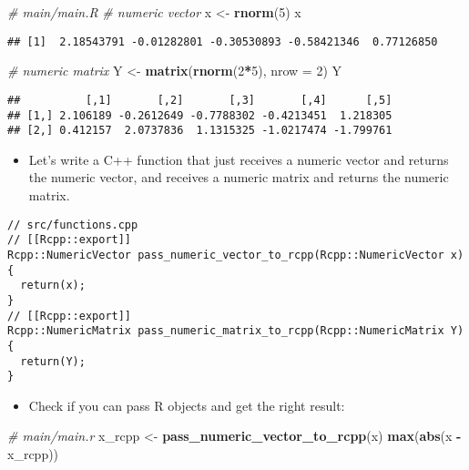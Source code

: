 \documentclass[
]{book}
\newenvironment{Shaded}{\begin{snugshade}}{\end{snugshade}}
\newcommand{\AttributeTok}[1]{\textcolor[rgb]{0.13,0.29,0.53}{#1}}
\newcommand{\CommentTok}[1]{\textcolor[rgb]{0.56,0.35,0.01}{\textit{#1}}}
\newcommand{\DecValTok}[1]{\textcolor[rgb]{0.00,0.00,0.81}{#1}}
\newcommand{\FunctionTok}[1]{\textcolor[rgb]{0.13,0.29,0.53}{\textbf{#1}}}
\newcommand{\NormalTok}[1]{#1}
\newcommand{\OtherTok}[1]{\textcolor[rgb]{0.56,0.35,0.01}{#1}}
\newcommand{\SpecialCharTok}[1]{\textcolor[rgb]{0.81,0.36,0.00}{\textbf{#1}}}
\providecommand{\tightlist}{%
  \setlength{\itemsep}{0pt}\setlength{\parskip}{0pt}}
\begin{document}
\begin{Shaded}
\begin{Highlighting}[]
\CommentTok{\# main/main.R}
\CommentTok{\# numeric vector }
\NormalTok{x }\OtherTok{\textless{}{-}} \FunctionTok{rnorm}\NormalTok{(}\DecValTok{5}\NormalTok{)}
\NormalTok{x}
\end{Highlighting}
\end{Shaded}

\begin{verbatim}
## [1]  2.18543791 -0.01282801 -0.30530893 -0.58421346  0.77126850
\end{verbatim}

\begin{Shaded}
\begin{Highlighting}[]
\CommentTok{\# numeric matrix}
\NormalTok{Y }\OtherTok{\textless{}{-}} \FunctionTok{matrix}\NormalTok{(}\FunctionTok{rnorm}\NormalTok{(}\DecValTok{2}\SpecialCharTok{*}\DecValTok{5}\NormalTok{), }\AttributeTok{nrow =} \DecValTok{2}\NormalTok{)}
\NormalTok{Y}
\end{Highlighting}
\end{Shaded}

\begin{verbatim}
##          [,1]       [,2]       [,3]       [,4]      [,5]
## [1,] 2.106189 -0.2612649 -0.7788302 -0.4213451  1.218305
## [2,] 0.412157  2.0737836  1.1315325 -1.0217474 -1.799761
\end{verbatim}

\begin{itemize}
\tightlist
\item
  Let's write a C++ function that just receives a numeric vector and returns the numeric vector, and receives a numeric matrix and returns the numeric matrix.
\end{itemize}

\begin{verbatim}
// src/functions.cpp
// [[Rcpp::export]]
Rcpp::NumericVector pass_numeric_vector_to_rcpp(Rcpp::NumericVector x) {
  return(x);
}
// [[Rcpp::export]]
Rcpp::NumericMatrix pass_numeric_matrix_to_rcpp(Rcpp::NumericMatrix Y) {
  return(Y);
}
\end{verbatim}

\begin{itemize}
\tightlist
\item
  Check if you can pass R objects and get the right result:
\end{itemize}

\begin{Shaded}
\begin{Highlighting}[]
\CommentTok{\# main/main.r}
\NormalTok{x\_rcpp }\OtherTok{\textless{}{-}} \FunctionTok{pass\_numeric\_vector\_to\_rcpp}\NormalTok{(x)}
\FunctionTok{max}\NormalTok{(}\FunctionTok{abs}\NormalTok{(x }\SpecialCharTok{{-}}\NormalTok{ x\_rcpp))}
\end{Highlighting}
\end{Shaded}
\end{document}
